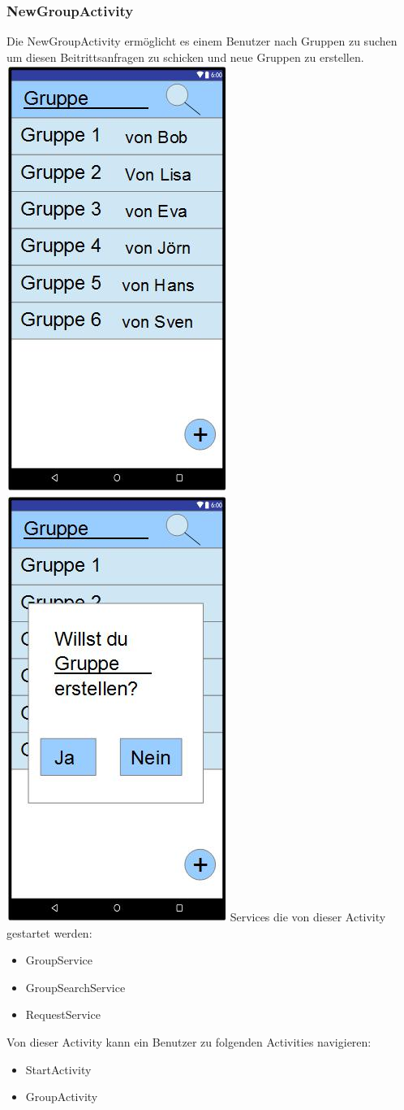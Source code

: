 	\subsubsection {NewGroupActivity}
	Die NewGroupActivity ermöglicht es einem Benutzer nach Gruppen zu suchen um diesen Beitrittsanfragen zu schicken und neue Gruppen zu erstellen.
	\newline
	\includegraphics[width=.3\textwidth]{GUI_NeueGruppe.jpg}
	\includegraphics[width=.3\textwidth]{GUI_GruppeNeuBest.jpg}
	\newline
	Services die von dieser Activity gestartet werden:
	\begin{itemize}
	\item GroupService
	\item GroupSearchService
	\item RequestService
	\end{itemize}
	Von dieser Activity kann ein Benutzer zu folgenden Activities navigieren:
	\begin{itemize} 
	 \item StartActivity
	 \item GroupActivity
	 \end{itemize}
	 
